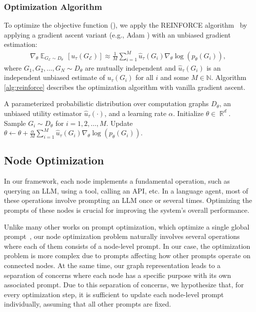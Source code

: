 \documentclass{article}
\DeclareMathOperator{\R}{\mathbb{R}}
\DeclareMathOperator{\E}{\mathbb{E}}
\theoremstyle{plain}
\theoremstyle{definition}
\theoremstyle{remark}
\begin{document}
\subsubsection{Optimization Algorithm}
To optimize the objective function (), we apply the REINFORCE algorithm~\citep{williams1992simple} by applying a gradient ascent variant (e.g., Adam \citep{kingma2014adam}) with an unbiased gradient estimation:
\small
\begin{align}
\nabla_\theta \E_{G_{\mathcal{E}} \sim D_\theta\ }[u_\tau(G_{\mathcal{E}})] \approx \frac{1}{M} \sum_{i=1}^M\hat{u}_\tau(G_i) \nabla_\theta \log(p_\theta(G_i)),
\label{eq:grad}
\end{align}
\normalsize
where $G_1, G_2, \dots, G_N \sim D_\theta$ are mutually independent and $\hat u_\tau(G_i)$ is an independent unbiased estimate of $u_\tau(G_i)$ for all $i$ and some $M \in \mathbb{N}$.
Algorithm \ref{alg:reinforce} describes the optimization algorithm with vanilla gradient ascent.


\begin{algorithm}[h]
\begin{algorithmic}
\REQUIRE A parameterized probabilistic distribution over computation graphs $D_\theta$, an unbiased utility estimator $\hat u_\tau(\cdot)$, and a learning rate $\alpha$.
\STATE Initialize $\theta \in \R^d$.
\STATE Sample $G_i \sim D_\theta$ for $i = 1, 2, \dots, M$.
\STATE Update $\theta \leftarrow \theta + \frac{\alpha}{M} \sum_{i=1}^M\hat{u}_\tau(G_i) \nabla_\theta \log(p_\theta(G_i))$.
\ENDWHILE
\end{algorithmic}
\caption{Edge Optimization with REINFORCE}\label{alg:reinforce}
\end{algorithm}

\subsection{Node Optimization}

\label{sec:node_opt}
In our framework, each node implements a fundamental operation, such as querying an LLM, using a tool, calling an API, etc. 
In a language agent, most of these operations involve prompting an LLM once or several times.
Optimizing the prompts of these nodes is crucial for improving the system's overall performance.

Unlike many other works on prompt optimization, which optimize a single global prompt~\citep[e.g.,][]{yang2023large,pryzant2023automatic,deng2022rlprompt}, our node optimization problem naturally involves several operations where each of them consists of a node-level prompt.
In our case, the optimization problem is more complex due to prompts affecting how other prompts operate on connected nodes.
At the same time, our graph representation leads to a separation of concerns where each node has a specific purpose with its own associated prompt.
Due to this separation of concerns, we hypothesize that, for every optimization step, it is sufficient to update each node-level prompt individually, assuming that all other prompts are fixed.
\end{document}
